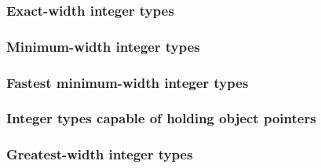 \def\Subsubsection#1{\subsubsection{#1}}

\Subsubsection{Exact-width integer types}

\Subsubsection{Minimum-width integer types}

\Subsubsection{Fastest minimum-width integer types}

\Subsubsection{Integer types capable of holding object pointers}

\Subsubsection{Greatest-width integer types}
